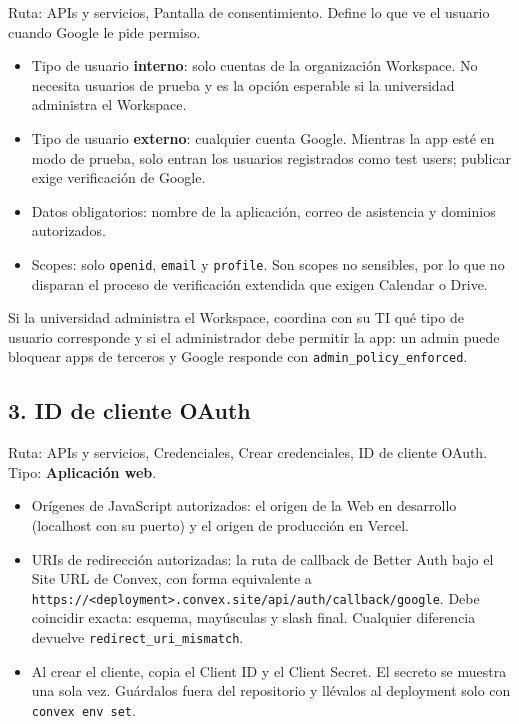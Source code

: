 \documentclass[11pt,a4paper]{article}
\begin{document}
Ruta: APIs y servicios, Pantalla de consentimiento. Define lo que ve el
usuario cuando Google le pide permiso.

\begin{itemize}
  \item Tipo de usuario \textbf{interno}: solo cuentas de la organización
    Workspace. No necesita usuarios de prueba y es la opción esperable si la
    universidad administra el Workspace.
  \item Tipo de usuario \textbf{externo}: cualquier cuenta Google. Mientras la
    app esté en modo de prueba, solo entran los usuarios registrados como
    test users; publicar exige verificación de Google.
  \item Datos obligatorios: nombre de la aplicación, correo de asistencia y
    dominios autorizados.
  \item Scopes: solo \texttt{openid}, \texttt{email} y \texttt{profile}. Son
    scopes no sensibles, por lo que no disparan el proceso de verificación
    extendida que exigen Calendar o Drive.
\end{itemize}

Si la universidad administra el Workspace, coordina con su TI qué tipo de
usuario corresponde y si el administrador debe permitir la app: un admin
puede bloquear apps de terceros y Google responde con
\texttt{admin\_policy\_enforced}.

\subsection{3. ID de cliente OAuth}

Ruta: APIs y servicios, Credenciales, Crear credenciales, ID de cliente
OAuth. Tipo: \textbf{Aplicación web}.

\begin{itemize}
  \item Orígenes de JavaScript autorizados: el origen de la Web en desarrollo
    (localhost con su puerto) y el origen de producción en Vercel.
  \item URIs de redirección autorizadas: la ruta de callback de Better Auth
    bajo el Site URL de Convex, con forma equivalente a
    \texttt{https://<deployment>.convex.site/api/auth/callback/google}.
    Debe coincidir exacta: esquema, mayúsculas y slash final. Cualquier
    diferencia devuelve \texttt{redirect\_uri\_mismatch}.
  \item Al crear el cliente, copia el Client ID y el Client Secret. El secreto
    se muestra una sola vez. Guárdalos fuera del repositorio y llévalos al
    deployment solo con \texttt{convex env set}.
\end{itemize}
\end{document}
